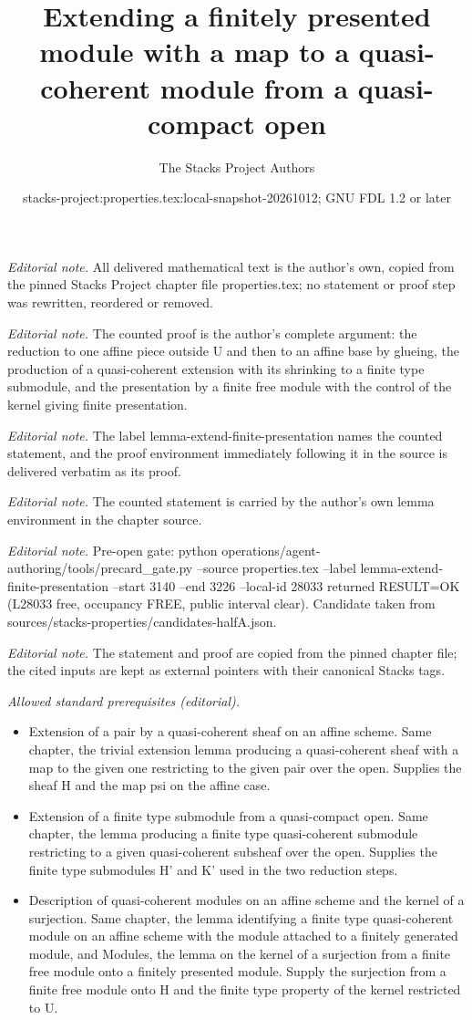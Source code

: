 \documentclass[10pt,a4paper]{amsart}
\title{Extending a finitely presented module with a map to a quasi-coherent module from a quasi-compact open}
\author{The Stacks Project Authors}
\date{stacks-project:properties.tex:local-snapshot-20261012; GNU FDL 1.2 or later}
\theoremstyle{plain}
\theoremstyle{definition}
\theoremstyle{remark}
\numberwithin{equation}{subsection}
\begin{document}
\maketitle
\noindent\textit{Editorial note.} All delivered mathematical text is the author's own, copied from the pinned Stacks Project chapter file properties.tex; no statement or proof step was rewritten, reordered or removed.\par\medskip
\noindent\textit{Editorial note.} The counted proof is the author's complete argument: the reduction to one affine piece outside U and then to an affine base by glueing, the production of a quasi-coherent extension with its shrinking to a finite type submodule, and the presentation by a finite free module with the control of the kernel giving finite presentation.\par\medskip
\noindent\textit{Editorial note.} The label lemma-extend-finite-presentation names the counted statement, and the proof environment immediately following it in the source is delivered verbatim as its proof.\par\medskip
\noindent\textit{Editorial note.} The counted statement is carried by the author's own lemma environment in the chapter source.\par\medskip
\noindent\textit{Editorial note.} Pre-open gate: python operations/agent-authoring/tools/precard\_gate.py --source properties.tex --label lemma-extend-finite-presentation --start 3140 --end 3226 --local-id 28033 returned RESULT=OK (L28033 free, occupancy FREE, public interval clear). Candidate taken from sources/stacks-properties/candidates-halfA.json.\par\medskip
\noindent\textit{Editorial note.} The statement and proof are copied from the pinned chapter file; the cited inputs are kept as external pointers with their canonical Stacks tags.\par\medskip
\noindent\textit{Allowed standard prerequisites (editorial).}\begin{itemize}
\item Extension of a pair by a quasi-coherent sheaf on an affine scheme. Same chapter, the trivial extension lemma producing a quasi-coherent sheaf with a map to the given one restricting to the given pair over the open. Supplies the sheaf H and the map psi on the affine case.
\item Extension of a finite type submodule from a quasi-compact open. Same chapter, the lemma producing a finite type quasi-coherent submodule restricting to a given quasi-coherent subsheaf over the open. Supplies the finite type submodules H' and K' used in the two reduction steps.
\item Description of quasi-coherent modules on an affine scheme and the kernel of a surjection. Same chapter, the lemma identifying a finite type quasi-coherent module on an affine scheme with the module attached to a finitely generated module, and Modules, the lemma on the kernel of a surjection from a finite free module onto a finitely presented module. Supply the surjection from a finite free module onto H and the finite type property of the kernel restricted to U.
\end{itemize}\medskip
\end{document}
